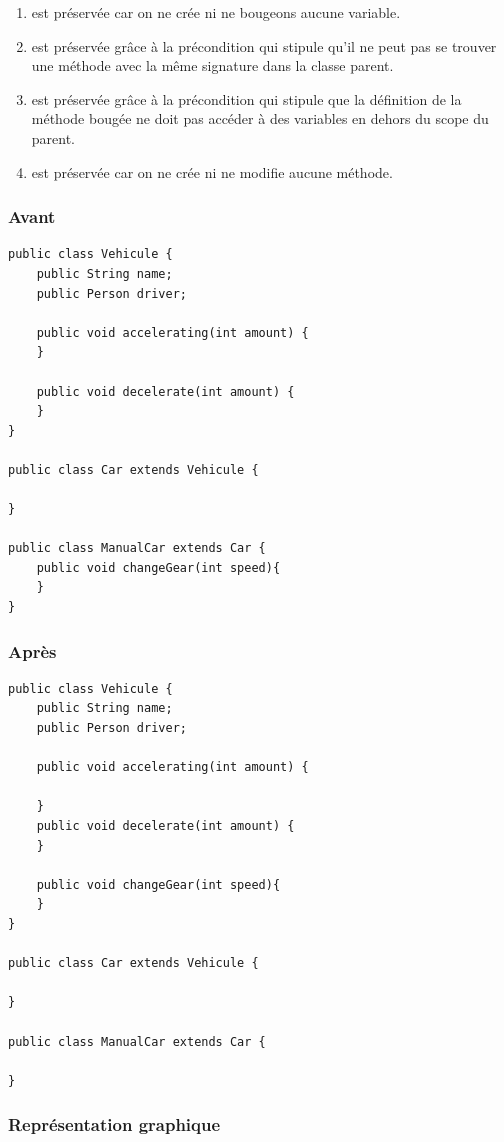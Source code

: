\documentclass[a4paper, 12pt]{article}
\begin{document}
\begin{enumerate}
\begin{enumerate}
\item est préservée car on ne crée ni ne bougeons aucune variable.
\item est préservée grâce à la précondition qui stipule qu'il ne peut pas se trouver une méthode avec la même signature dans la classe parent.
\item est préservée grâce à la précondition qui stipule que la définition de la méthode bougée ne doit pas accéder à des variables en dehors du scope du parent.
\item est préservée car on ne crée ni ne modifie aucune méthode.
\end{enumerate}

\subsubsection{Avant}
\begin{lstlisting}[frame=single]
public class Vehicule {
	public String name;
	public Person driver;

	public void accelerating(int amount) { 
	}

	public void decelerate(int amount) { 
	}
}

public class Car extends Vehicule {

}

public class ManualCar extends Car {
	public void changeGear(int speed){ 
	}
}
\end{lstlisting}

\subsubsection{Après}
\begin{lstlisting}[frame=single]
public class Vehicule {
	public String name;
	public Person driver;

	public void accelerating(int amount) {

	}
	public void decelerate(int amount) { 
	}
	
	public void changeGear(int speed){
	}
}

public class Car extends Vehicule {

}

public class ManualCar extends Car {

}
\end{lstlisting}

\subsubsection{Représentation graphique}


\end{enumerate}
\end{document}
